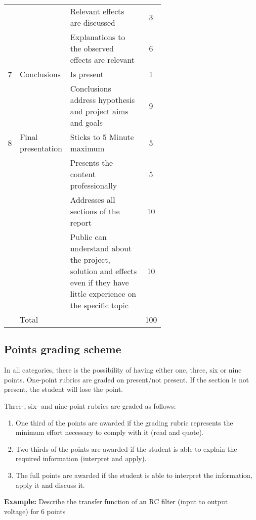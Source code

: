\documentclass[a4paper, 10pt]{IEEEtran}
\begin{document}
\begin{table*}[h]
\begin{tabular}{l p{0.13\linewidth} p{0.5\linewidth} c}
			& & Relevant effects are discussed & 3\\
			\cline{3-4}
			& & Explanations to the observed effects are relevant & 6\\
			\hline
			7 & Conclusions & Is present & 1 \\
			\cline{3-4}
			& & Conclusions address hypothesis and project aims and goals & 9 \\
			\hline
			8 & Final presentation & Sticks to 5 Minute maximum & 5 \\
			\cline{3-4}
			&& Presents the content professionally & 5\\
			\cline{3-4}
			&& Addresses all sections of the report & 10 \\
			\cline{3-4}
			&& Public can understand about the project, solution and effects even if they have little experience on the specific topic & 10\\
			\hline
			\hline
			 & Total & & 100 \\
		\end{tabular}
	\end{table*}

	\subsection{Points grading scheme}
	
	In all categories, there is the possibility of having either one, three, six or nine points. One-point rubrics are graded on present/not present. If the section is not present, the student will lose the point.
	
	Three-, six- and nine-point rubrics are graded as follows:
	
	\begin{enumerate}
		\item One third of the points are awarded if the grading rubric represents the minimum effort necessary to comply with it (read and quote).
		\item Two thirds of the points are awarded if the student is able to explain the required information  (interpret and apply).
		\item The full points are awarded if the student is able to interpret the information, apply it and discuss it.
	\end{enumerate}

	{\bfseries Example:} Describe the transfer function of an RC filter (input to output voltage) for 6 points
	
\end{document}
